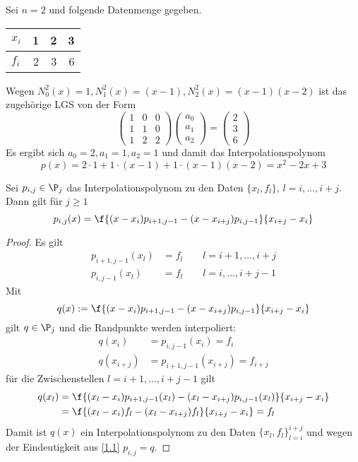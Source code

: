 \documentclass[11pt]{scrbook}
\begin{document}
\begin{ex*}
	Sei $n=2$ und folgende Datenmenge gegeben.	
	\begin{table}[H]
		\centering
		\begin{tabular}{l|rrr}
			$x_i$ & 1 & 2 & 3  \\ \hline
			$f_i$ & 2 & 3 & 6 
		\end{tabular}
	\end{table}

	Wegen $N_0^2(x) = 1, N_1^2(x) = (x-1), N_2^2(x) = (x-1)(x-2)$ ist das zugehörige LGS von der Form
	\[
	\begin{pmatrix}1&0&0\\1&1&0\\1&2&2\end{pmatrix}\begin{pmatrix}a_0\\a_1\\a_2\end{pmatrix} = \begin{pmatrix}2\\3\\6\end{pmatrix}
	\]
	Es ergibt sich $a_0=2,a_1=1, a_2=1$ und damit das Interpolationspolynom
	\[
		p(x) = 2\cdot 1 + 1\cdot(x-1) + 1\cdot(x-1)(x-2) = x^2 - 2x+3
	\]
\end{ex*}

\begin{st}[Rekursionsformel]
	\label{1.5}
	Sei $p_{i,j}\in \P_j$ das Interpolationspolynom zu den Daten $\{x_l,f_l\}$, $l=i,\dotsc,i+j$.
	Dann gilt für $j\ge 1$
	\[
		p_{i,j}(x) = \f {(x-x_i)p_{i+1,j-1} - (x-x_{i+j})p_{i,j-1}}{x_{i+j}-x_i}
	\]
	\begin{proof}
		Es gilt
		\begin{align*}
			p_{i+1,j-1}(x_l) &= f_l \qquad l=i+1,\dotsc,i+j\\
			p_{i,j-1}(x_l) &= f_l \qquad l=i,\dotsc,i+j-1
		\end{align*}
		Mit
		\[
			q(x) := \f {(x-x_i)p_{i+1,j-1} - (x-x_{i+j})p_{i,j-1}}{x_{i+j}-x_i}
		\]
		gilt $q\in \P_j$ und die Randpunkte werden interpoliert:
		\begin{align*}
			q(x_i) &= p_{i,j-1}(x_i) = f_i\\
			q(x_{i+j}) &= p_{i+1,j-1}(x_{i+j}) = f_{i+j}
		\end{align*}
		für die Zwischenstellen $l=i+1,\dotsc,i+j-1$ gilt
		\begin{align*}
			q(x_l) &= \f {(x_l-x_i)p_{i+1,j-1}(x_l) - (x_l-x_{i+j})p_{i,j-1}(x_l)}{x_{i+j}-x_i}\\
				   &= \f {(x_l-x_i)f_l - (x_l-x_{i+j})f_l}{x_{i+j}-x_i} = f_l
		\end{align*}
		Damit ist $q(x)$ ein Interpolationspolynom zu den Daten $\{x_l,f_l\}_{l=i}^{i+j}$ und wegen der Eindeutigkeit aus \ref{1.1} $p_{i,j}=q$.
	\end{proof}
\end{st}
\end{document}
